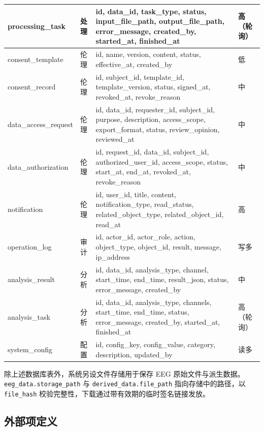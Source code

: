 {\begin{longtable}{|p{28mm}|p{18mm}|p{76mm}|p{16mm}|}
processing\_task & 处理 & id, data\_id, task\_type, status, input\_file\_path, output\_file\_path, error\_message, created\_by, started\_at, finished\_at & 高（轮询）\\ \hline
consent\_template & 伦理 & id, name, version, content, status, effective\_at, created\_by & 低 \\ \hline
consent\_record & 伦理 & id, subject\_id, template\_id, template\_version, status, signed\_at, revoked\_at, revoke\_reason & 中 \\ \hline
data\_access\_\allowbreak request & 伦理 & id, data\_id, requester\_id, subject\_id, purpose, description, access\_scope, export\_format, status, review\_opinion, reviewed\_at & 中 \\ \hline
data\_\allowbreak authorization & 伦理 & id, request\_id, data\_id, subject\_id, authorized\_user\_id, access\_scope, status, start\_at, end\_at, revoked\_at, revoke\_reason & 中 \\ \hline
notification & 伦理 & id, user\_id, title, content, notification\_type, read\_status, related\_object\_type, related\_object\_id, read\_at & 高 \\ \hline
operation\_log & 审计 & id, actor\_id, actor\_role, action, object\_type, object\_id, result, message, ip\_address & 写多 \\ \hline
analysis\_result & 分析 & id, data\_id, analysis\_type, channel, start\_time, end\_time, result\_json, status, error\_message, created\_by & 中 \\ \hline
analysis\_task & 分析 & id, data\_id, analysis\_type, channels, start\_time, end\_time, status, error\_message, created\_by, started\_at, finished\_at & 高（轮询）\\ \hline
system\_config & 配置 & id, config\_key, config\_value, category, description, updated\_by & 读多 \\ \hline
\end{longtable}
}

除上述数据库表外，系统另设文件存储用于保存 EEG 原始文件与派生数据。\texttt{eeg\_\allowbreak data.storage\_\allowbreak path} 与 \texttt{derived\_\allowbreak data.file\_\allowbreak path} 指向存储中的路径，以 \texttt{file\_\allowbreak hash} 校验完整性，下载通过带有效期的临时签名链接发放。

\subsection{外部项定义}

